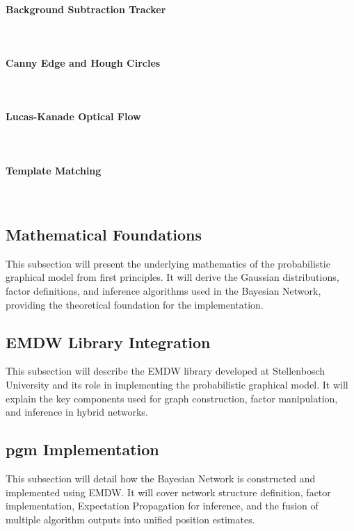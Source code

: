 \documentclass[12pt,a4paper]{article}
\begin{document}
\paragraph{Background Subtraction Tracker}
\mbox{}\\

\paragraph{Canny Edge and Hough Circles}
\mbox{}\\

\paragraph{Lucas-Kanade Optical Flow}
\mbox{}\\

\paragraph{Template Matching}
\mbox{}\\


\subsection{Mathematical Foundations}
This subsection will present the underlying mathematics of the probabilistic graphical model from first principles. It will derive the Gaussian distributions, factor definitions, and inference algorithms used in the Bayesian Network, providing the theoretical foundation for the implementation.

\subsection{EMDW Library Integration}
This subsection will describe the EMDW library developed at Stellenbosch University and its role in implementing the probabilistic graphical model. It will explain the key components used for graph construction, factor manipulation, and inference in hybrid networks.

\subsection{\acs{pgm} Implementation}
This subsection will detail how the Bayesian Network is constructed and implemented using EMDW. It will cover network structure definition, factor implementation, Expectation Propagation for inference, and the fusion of multiple algorithm outputs into unified position estimates.
\end{document}
